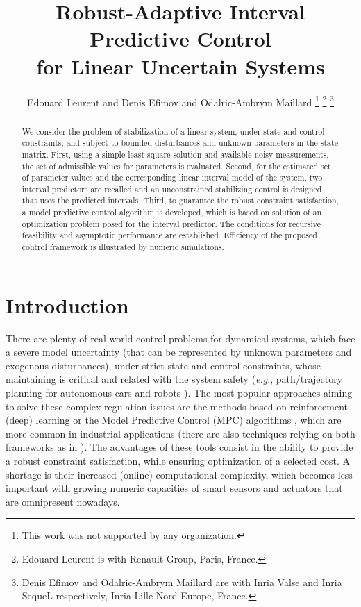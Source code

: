 \documentclass[letterpaper, 10 pt, conference]{ieeeconf}  %
\title{\LARGE \bf
	Robust-Adaptive Interval Predictive Control \\for Linear Uncertain Systems
}
\author{Edouard Leurent and Denis Efimov and Odalric-Ambrym Maillard%
	\thanks{This work was not supported by any organization.}%
	\thanks{Edouard Leurent is with Renault Group, Paris, France.}%
	\thanks{Denis Efimov and Odalric-Ambrym Maillard are with Inria Valse and Inria SequeL respectively, Inria Lille Nord-Europe, France.}%
}
\begin{document}
\maketitle
\thispagestyle{empty}
\pagestyle{empty}

\begin{abstract}
We consider the problem of stabilization of a linear system, under
state and control constraints, and subject to bounded disturbances
and unknown parameters in the state matrix. First, using a simple
least square solution and available noisy measurements, the set of
admissible values for parameters is evaluated. Second, for the estimated
set of parameter values and the corresponding linear interval model
of the system, two interval predictors are recalled and an unconstrained
stabilizing control is designed that uses the predicted intervals.
Third, to guarantee the robust constraint satisfaction, a model predictive
control algorithm is developed, which is based on solution of an optimization
problem posed for the interval predictor. The conditions for recursive
feasibility and asymptotic performance are established. Efficiency
of the proposed control framework is illustrated by numeric simulations.
\end{abstract}

\section{Introduction}

There are plenty of real-world control problems for dynamical systems,
which face a severe model uncertainty (that can be represented by
unknown parameters and exogenous disturbances), under strict state
and control constraints, whose maintaining is critical and related
with the system safety (\emph{e.g}., path/trajectory planning for
autonomous cars and robots \cite{leurent2019interval,Lenz2015}).
The most popular approaches aiming to solve these complex regulation
issues are the methods based on reinforcement (deep) learning \cite{mnih2015humanlevel,Silver1140}
or the Model Predictive Control (MPC) algorithms \cite{Basar1996,MPC1,MPC:Tube2},
which are more common in industrial applications (there are also techniques
relying on both frameworks as in \cite{Lenz2015,Dean2018}). The advantages
of these tools consist in the ability to provide a robust constraint
satisfaction, while ensuring optimization of a selected cost. A shortage
is their increased (online) computational complexity, which becomes
less important with growing numeric capacities of smart sensors and
actuators that are omnipresent nowadays.
\end{document}
